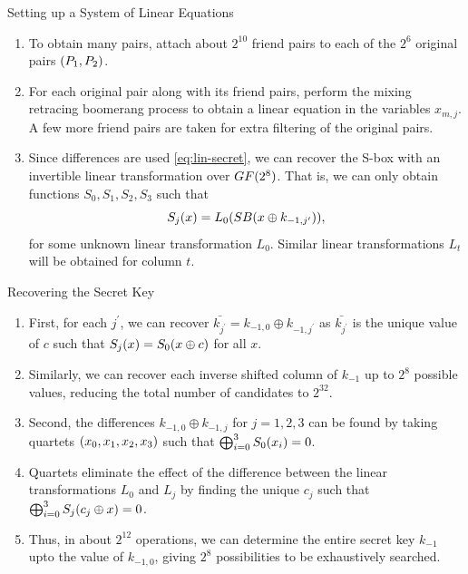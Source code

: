 \documentclass[notheorems]{beamer}
\theoremstyle{definition}
\theoremstyle{example}
\begin{document}
    \begin{frame}[<+->]{Setting up a System of Linear Equations}
        \begin{enumerate}
            \conti
            \item To obtain many pairs, attach about \(2^{10}\) friend pairs to
            each of the \(2^6\) original pairs \((P_1, P_2)\).
            \item For each original pair along with its friend pairs, perform
            the mixing retracing boomerang process to obtain a linear equation
            in the variables \(x_{m, j}\). A few more friend pairs are taken for
            extra filtering of the original pairs.
            \item Since differences are used \eqref{eq:lin-secret}, we can
            recover the S-box with an invertible linear transformation over
            \(GF(2^8)\). That is, we can only obtain functions \(S_0, S_1,
            S_2, S_3\) such that
            \begin{equation}
                S_j(x) = L_0(SB(x \oplus k_{-1, j^\prime})),
            \end{equation}
            for some unknown linear transformation \(L_0\). Similar linear
            transformations \(L_t\) will be obtained for column \(t\).
        \end{enumerate}    
    \end{frame}

    \begin{frame}[<+->]{Recovering the Secret Key}
        \begin{enumerate}
            \item First, for each \(j^\prime\), we can recover 
            \(\bar{k_{j^\prime}} = k_{-1, 0} \oplus k_{-1, {j^\prime}}\) as 
            \(\bar{k_{j^\prime}}\) is the unique value of \(c\) such that
            \(S_j(x) = S_0(x \oplus c)\) for all \(x\).
            \item Similarly, we can recover each inverse shifted column of
            \(k_{-1}\) up to \(2^8\) possible values, reducing the total number
            of candidates to \(2^{32}\).
            \item Second, the differences \(k_{-1, 0} \oplus k_{-1, j}\) for
            \(j = 1, 2, 3\) can be found by taking quartets \((x_0, x_1,
            x_2, x_3)\) such that \(\bigoplus_{i=0}^3S_0(x_i) = 0\).
            \item Quartets eliminate the effect of the difference between the
            linear transformations \(L_0\) and \(L_j\) by finding the unique
            \(c_j\) such that \(\bigoplus_{i=0}^3 S_j(c_j \oplus x) = 0\).
            \item Thus, in about \(2^{12}\) operations, we can determine the 
            entire secret key \(k_{-1}\) upto the value of \(k_{-1, 0}\), 
            giving \(2^8\) possibilities to be exhaustively searched.
        \end{enumerate}
    \end{frame}
\end{document}
